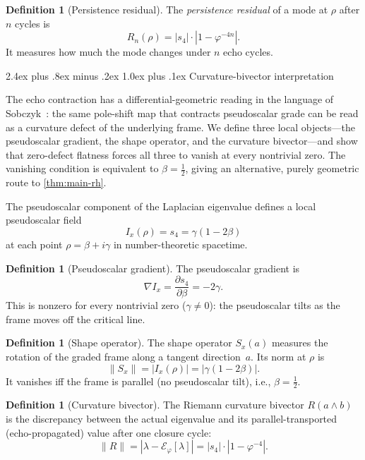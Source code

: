 \documentclass[11pt,a4paper]{article}
\makeatletter
\theoremstyle{plain}
\theoremstyle{definition}
\newtheorem{definition}[theorem]{Definition}
\theoremstyle{remark}
\numberwithin{equation}{section}
\newcommand{\vp}{\varphi}
\renewcommand{\subsection}{%
  \@startsection{subsection}{2}{0pt}%
    {2.4ex plus .8ex minus .2ex}%
    {1.0ex plus .1ex}%
    {\normalfont\Large\bfseries\color{headingAccent}}%
}
\makeatother
\begin{document}
\begin{definition}[Persistence residual]
\label{def:persistence-residual}
The \emph{persistence residual} of a mode at \(\rho\) after \(n\) cycles
is
\[
  R_n(\rho)=|s_4|\cdot|1-\vp^{-4n}|.
\]
It measures how much the mode changes under \(n\) echo cycles.
\end{definition}

\subsection{Curvature-bivector interpretation}
\label{subsec:curvature-bivector}

The echo contraction has a differential-geometric reading in the
language of Sobczyk~\cite{sobczyk1971}: the same pole-shift map
that contracts pseudoscalar grade can be read as a curvature
defect of the underlying frame.  We define three local objects---the
pseudoscalar gradient, the shape operator, and the curvature
bivector---and show that zero-defect flatness forces all three to
vanish at every nontrivial zero.  The vanishing condition is
equivalent to \(\beta=\tfrac12\), giving an alternative, purely
geometric route to \cref{thm:main-rh}.

The pseudoscalar component of the Laplacian eigenvalue defines a
local pseudoscalar field
\[
  I_x(\rho)=s_4=\gamma(1-2\beta)
\]
at each point \(\rho=\beta+i\gamma\) in number-theoretic spacetime.

\begin{definition}[Pseudoscalar gradient]
The pseudoscalar gradient is
\[
  \nabla I_x=\frac{\partial s_4}{\partial\beta}=-2\gamma.
\]
This is nonzero for every nontrivial zero (\(\gamma\ne0\)):
the pseudoscalar tilts as the frame moves off the critical line.
\end{definition}

\medskip

\begin{definition}[Shape operator]
The shape operator \(S_x(a)\) measures the rotation of the graded
frame along a tangent direction~\(a\).  Its norm at \(\rho\) is
\[
  \|S_x\|=|I_x(\rho)|=|\gamma(1-2\beta)|.
\]
It vanishes iff the frame is parallel (no pseudoscalar tilt), i.e.,
\(\beta=\tfrac12\).
\end{definition}

\medskip

\begin{definition}[Curvature bivector]
\label{def:curvature-bivector}
The Riemann curvature bivector \(R(a\wedge b)\) is the discrepancy
between the actual eigenvalue and its parallel-transported
(echo-propagated) value after one closure cycle:
\[
  \|R\|=|\lambda-\mathcal{E}_\vp[\lambda]|
  =|s_4|\cdot|1-\vp^{-4}|.
\]
\end{definition}
\end{document}

